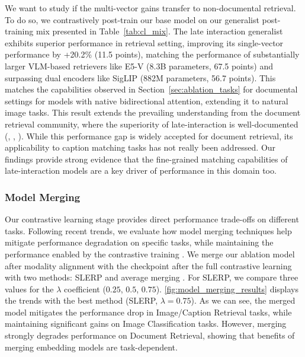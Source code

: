 We want to study if the multi-vector gains transfer to non-documental retrieval. To do so, we contrastively post-train our base model on our generalist post-training mix presented in Table~\ref{tab:cl_mix}.
The late interaction generalist exhibits superior performance in retrieval setting, improving its single-vector performance by +20.2\% (11.5 points), matching the performance of substantially larger VLM-based retrievers like E5-V (8.3B parameters, 67.5 points) and surpassing dual encoders like SigLIP (882M parameters, 56.7 points). This matches the capabilities observed in Section~\ref{sec:ablation_tasks} for documental settings for models with native bidirectional attention, extending it to natural image tasks. This result extends the prevailing understanding from the document retrieval community, where the superiority of late-interaction is well-documented (\cite{khattab2020colbert}, \cite{GTE-ModernColBERT}, \cite{faysse2025colpaliefficientdocumentretrieval}). While this performance gap is widely accepted for document retrieval, its applicability to caption matching tasks has not really been addressed. Our findings provide strong evidence that the fine-grained matching capabilities of late-interaction models are a key driver of performance in this domain too.


\subsubsection{Model Merging}\label{appendix:model_merging}
Our contrastive learning stage provides direct performance trade-offs on different tasks. Following recent trends, we evaluate how model merging techniques help mitigate performance degradation on specific tasks, while maintaining the performance enabled by the contrastive training . We merge our ablation model after modality alignment with the checkpoint after the full contrastive learning with two methods: SLERP  and average merging . For SLERP, we compare three values for the $\lambda$ coefficient ($0.25$, $0.5$, $0.75$). \autoref{fig:model_merging_results} displays the trends with the best method (SLERP, $\lambda = 0.75$). As we can see, the merged model mitigates the performance drop in Image/Caption Retrieval tasks, while maintaining significant gains on Image Classification tasks. However, merging strongly degrades performance on Document Retrieval, showing that benefits of merging embedding models are task-dependent.

